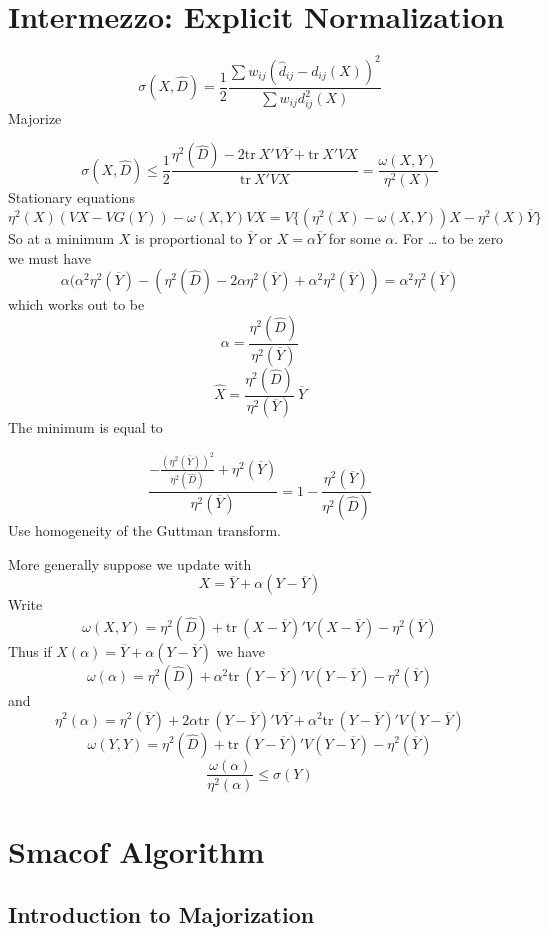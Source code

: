 \documentclass[
  12pt,
  letterpaper,
  DIV=11,
  numbers=noendperiod]{scrartcl}
\theoremstyle{plain}
\theoremstyle{remark}
\begin{document}
\section{Intermezzo: Explicit
Normalization}\label{intermezzo-explicit-normalization}

\[
\sigma(X,\hat D)=\frac12\frac{\sum w_{ij}(\hat d_{ij}-d_{ij}(X))^2}{\sum w_{ij}d_{ij}^2(X)}
\] Majorize

\[
\sigma(X,\hat D)\leq\frac12\frac{\eta^2(\hat D)-2\text{tr}\ X'V\overline{Y}+\text{tr}\ X'VX}{\text{tr}\ X'VX}=\frac{\omega(X,Y)}{\eta^2(X)}
\] Stationary equations \[
\eta^2(X)(VX-VG(Y))-\omega(X,Y)VX=V\{(\eta^2(X)-\omega(X,Y))X-\eta^2(X)\overline Y\}
\] So at a minimum \(X\) is proportional to \(\overline{Y}\) or
\(X=\alpha\overline{Y}\) for some \(\alpha\). For \ldots{} to be zero we
must have \[
\alpha(\alpha^2\eta^2(\overline Y)-(\eta^2(\hat D)-2\alpha\eta^2(\overline Y)+\alpha^2\eta^2(\overline Y))=\alpha^2\eta^2(\overline Y)
\] which works out to be \[
\alpha=\frac{\eta^2(\hat D)}{\eta^2(\overline Y)}
\] \[
\hat X=\frac{\eta^2(\hat D)}{\eta^2(\overline Y)}\ \overline{Y}
\] The minimum is equal to

\[
\frac{-\frac{(\eta^2(\overline Y))^2}{\eta^2(\hat D)}+\eta^2(\overline Y)}{\eta^2(\overline Y)}=1-\frac{\eta^2(\overline Y)}{\eta^2(\hat D)}
\] Use homogeneity of the Guttman transform.

More generally suppose we update with \[
X=\overline Y+\alpha(Y-\overline Y)
\] Write \[
\omega(X,Y)=\eta^2(\hat D)+\text{tr}\ (X-\overline Y)'V(X-\overline Y)-\eta^2(\overline Y)
\] Thus if \(X(\alpha)=\overline Y+\alpha(Y-\overline Y)\) we have \[
\omega(\alpha)=\eta^2(\hat D)+\alpha^2\text{tr}\ (Y-\overline Y)'V(Y-\overline Y)-\eta^2(\overline Y)
\] and \[
\eta^2(\alpha)=\eta^2(\overline Y)+2\alpha\text{tr}\ (Y-\overline Y)'V\overline Y+\alpha^2\text{tr}\ (Y-\overline Y)'V(Y-\overline Y)
\] \[
\omega(Y,Y)=\eta^2(\hat D)+\text{tr}\ (Y-\overline Y)'V(Y-\overline Y)-\eta^2(\overline Y)
\] \[
\frac{\omega(\alpha)}{\eta^2(\alpha)}\leq\sigma(Y)
\]

\section{Smacof Algorithm}\label{smacof-algorithm}

\subsection{Introduction to
Majorization}\label{introduction-to-majorization}
\end{document}
